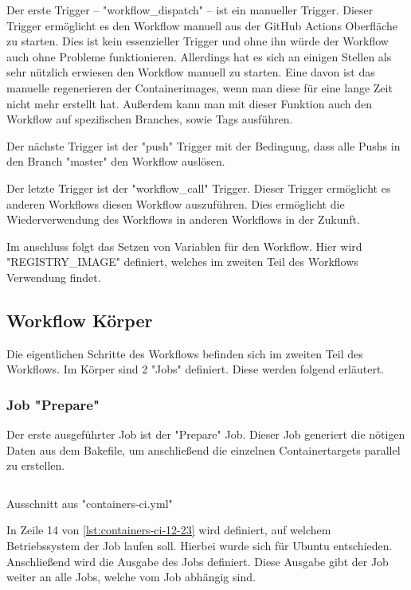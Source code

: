Der erste Trigger – "workflow\_dispatch" – ist ein manueller Trigger. Dieser Trigger ermöglicht es den Workflow manuell aus der GitHub Actions Oberfläche zu starten. Dies ist kein essenzieller Trigger und ohne ihn würde der Workflow auch ohne Probleme funktionieren. Allerdings hat es sich an einigen Stellen als sehr nützlich erwiesen den Workflow manuell zu starten. Eine davon ist das manuelle regenerieren der Containerimages, wenn man diese für eine lange Zeit nicht mehr erstellt hat. Außerdem kann man mit dieser Funktion auch den Workflow auf spezifischen Branches, sowie Tags ausführen.

Der nächste Trigger ist der "push" Trigger mit der Bedingung, dass alle Pushs in den Branch "master" den Workflow auslösen.

Der letzte Trigger ist der "workflow\_call" Trigger. Dieser Trigger ermöglicht es anderen Workflows diesen Workflow auszuführen. Dies ermöglicht die Wiederverwendung des Workflows in anderen Workflows in der Zukunft. 

Im anschluss folgt das Setzen von Variablen für den Workflow. Hier wird "REGISTRY\_IMAGE" definiert, welches im zweiten Teil des Workflows Verwendung findet.

\subsection{Workflow Körper}

Die eigentlichen Schritte des Workflows befinden sich im zweiten Teil des Workflows. Im Körper sind 2 "Jobs" definiert. Diese werden folgend erläutert.

\subsubsection{Job "Prepare"} \label{ssec:job-prepare}

Der erste ausgeführter Job ist der "Prepare" Job. Dieser Job generiert die nötigen Daten aus dem Bakefile, um anschließend die einzelnen Containertargets parallel zu erstellen.

\begin{listing}[H]
    \inputminted[firstline=12,lastline=23]{yaml}{./code-examples/containers-ci.yml}
    \caption{Ausschnitt aus "containers-ci.yml"}
    \label{lst:containers-ci-12-23}
\end{listing}

In Zeile 14 von \cref{lst:containers-ci-12-23} wird definiert, auf welchem Betriebssystem der Job laufen soll. Hierbei wurde sich für Ubuntu entschieden. 
Anschließend wird die Ausgabe des Jobs definiert. Diese Ausgabe gibt der Job weiter an alle Jobs, welche vom Job abhängig sind.

